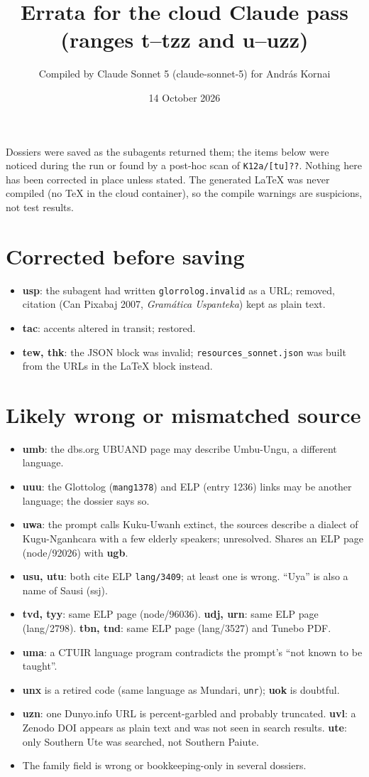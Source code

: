 \documentclass[11pt]{article}
\title{Errata for the cloud Claude pass (ranges t--tzz and u--uzz)}
\author{Compiled by Claude Sonnet 5 (claude-sonnet-5) for Andr\'as Kornai}
\date{14 October 2026}
\begin{document}
\maketitle
\noindent Dossiers were saved as the subagents returned them; the items below were noticed
during the run or found by a post-hoc scan of \texttt{K12a/[tu]??}. Nothing here has been
corrected in place unless stated. The generated LaTeX was never compiled (no TeX in the
cloud container), so the compile warnings are suspicions, not test results.

\section{Corrected before saving}
\begin{itemize}
\item \textbf{usp}: the subagent had written \texttt{glorrolog.invalid} as a URL; removed, citation (Can Pixabaj 2007, \emph{Gram\'atica Uspanteka}) kept as plain text.
\item \textbf{tac}: accents altered in transit; restored.
\item \textbf{tew, thk}: the JSON block was invalid; \texttt{resources\_sonnet.json} was built from the URLs in the LaTeX block instead.
\end{itemize}

\section{Likely wrong or mismatched source}
\begin{itemize}
\item \textbf{umb}: the dbs.org UBUAND page may describe Umbu-Ungu, a different language.
\item \textbf{uuu}: the Glottolog (\texttt{mang1378}) and ELP (entry 1236) links may be another language; the dossier says so.
\item \textbf{uwa}: the prompt calls Kuku-Uwanh extinct, the sources describe a dialect of Kugu-Nganhcara with a few elderly speakers; unresolved. Shares an ELP page (node/92026) with \textbf{ugb}.
\item \textbf{usu, utu}: both cite ELP \texttt{lang/3409}; at least one is wrong. ``Uya'' is also a name of Sausi (ssj).
\item \textbf{tvd, tyy}: same ELP page (node/96036). \textbf{udj, urn}: same ELP page (lang/2798). \textbf{tbn, tnd}: same ELP page (lang/3527) and Tunebo PDF.
\item \textbf{uma}: a CTUIR language program contradicts the prompt's ``not known to be taught''.
\item \textbf{unx} is a retired code (same language as Mundari, \texttt{unr}); \textbf{uok} is doubtful.
\item \textbf{uzn}: one Dunyo.info URL is percent-garbled and probably truncated. \textbf{uvl}: a Zenodo DOI appears as plain text and was not seen in search results. \textbf{ute}: only Southern Ute was searched, not Southern Paiute.
\item The family field is wrong or bookkeeping-only in several dossiers.
\end{itemize}
\end{document}
